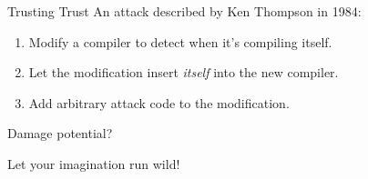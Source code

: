 \documentclass[12pt]{beamer}
\begin{document}

  \begin{frame}{Trusting Trust}
    An attack described by Ken Thompson in 1984:

    \begin{enumerate}
    \item Modify a compiler to detect when it's compiling itself.
    \item Let the modification insert \textit{itself} into the new compiler.
    \item Add arbitrary attack code to the modification.
    \end{enumerate}
  \end{frame}

  \begin{frame}{Damage potential?}
    \begin{center}
      Let your imagination run wild!
    \end{center}
  \end{frame}
\end{document}
